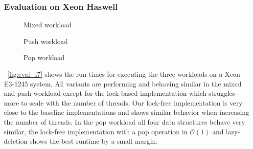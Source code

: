 \subsubsection{Evaluation on Xeon Haswell}
\begin{figure*}[t]
	\centering
	\begin{subfigure}[b]{0.3\textwidth}
		\centering
		
		\caption{Mixed workload}
		\label{fig:xeon_mixed}
	\end{subfigure}
	\hfill
	\begin{subfigure}[b]{0.3\textwidth}
		\centering
		
		\caption{Push workload}
		\label{fig:xeon_push}
	\end{subfigure}
	\hfill
	\begin{subfigure}[b]{0.3\textwidth}
		\centering
		
		\caption{Pop workload}
		\label{fig:xeon_pop}
	\end{subfigure}
	\caption{Runtime for different workloads executed on a Xeon E3-1245 while varying the number of threads}
	\label{fig:eval_i7}
\end{figure*}
\figurename~\ref{fig:eval_i7} shows the run-times for executing the three workloads on a Xeon E3-1245 system. All variants are performing and behaving similar in the mixed and push workload except for the lock-based implementation which struggles more to scale with the number of threads. Our lock-free implementation is very close to the baseline implementations and shows similar behavior when increasing the number of threads. In the pop workload all four data structures behave very similar, the lock-free implementation with a pop operation in $\mathcal{O}(1)$ and lazy-deletion shows the best runtime by a small margin.

